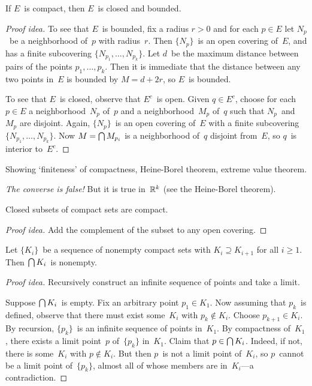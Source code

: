 \begin{thm}
If \(E\)~is compact, then \(E\)~is closed and bounded.
\end{thm}
\begin{proof}[Proof idea]
To see that \(E\)~is bounded, fix a radius \(r>0\) and for each \(p\in E\) let \(N_p\)~be a neighborhood of~\(p\) with radius~\(r\). Then \(\{N_p\}\)~is an open covering of~\(E\), and has a finite subcovering \(\{N_{p_1},\ldots,N_{p_k}\}\). Let \(d\)~be the maximum distance between pairs of the points \(p_1,\ldots,p_k\). Then it is immediate that the distance between any two points in~\(E\) is bounded by \(M=d+2r\), so \(E\)~is bounded.

To see that \(E\)~is closed, observe that \(E^c\)~is open. Given \(q\in E^c\), choose for each \(p\in E\) a neighborhood~\(N_p\) of~\(p\) and a neighborhood~\(M_p\) of~\(q\) such that \(N_p\)~and~\(M_p\) are disjoint. Again, \(\{N_p\}\)~is an open covering of~\(E\) with a finite subcovering \(\{N_{p_1},\ldots,N_{p_k}\}\). Now \(M=\bigcap M_{p_i}\) is a neighborhood of~\(q\) disjoint from~\(E\), so \(q\)~is interior to~\(E^c\).
\end{proof}
\begin{app}
Showing `finiteness' of compactness, Heine-Borel theorem, extreme value theorem.
\end{app}

\begin{rmk}
\emph{The converse is false!} But it is true in~\(\mathbb{R}^k\) (see the Heine-Borel theorem).
\end{rmk}

\begin{thm}
Closed subsets of compact sets are compact.
\end{thm}
\begin{proof}[Proof idea]
Add the complement of the subset to any open covering.
\end{proof}

\begin{thm}
Let \(\{K_i\}\)~be a sequence of nonempty compact sets with \(K_i\supseteq K_{i+1}\) for all \(i\ge 1\). Then \(\bigcap K_i\)~is nonempty.
\end{thm}
\begin{proof}[Proof idea]
Recursively construct an infinite sequence of points and take a limit.

Suppose \(\bigcap K_i\)~is empty. Fix an arbitrary point \(p_1\in K_1\). Now assuming that \(p_k\)~is defined, observe that there must exist some~\(K_i\) with \(p_k\not\in K_i\). Choose \(p_{k+1}\in K_i\). By recursion, \(\{p_k\}\)~is an infinite sequence of points in~\(K_1\). By compactness of~\(K_1\), there exists a limit point~\(p\) of~\(\{p_k\}\) in~\(K_1\). Claim that \(p\in\bigcap K_i\). Indeed, if not, there is some~\(K_i\) with \(p\not\in K_i\). But then \(p\)~is not a limit point of~\(K_i\), so \(p\)~cannot be a limit point of~\(\{p_k\}\), almost all of whose members are in~\(K_i\)---a contradiction.
\end{proof}

